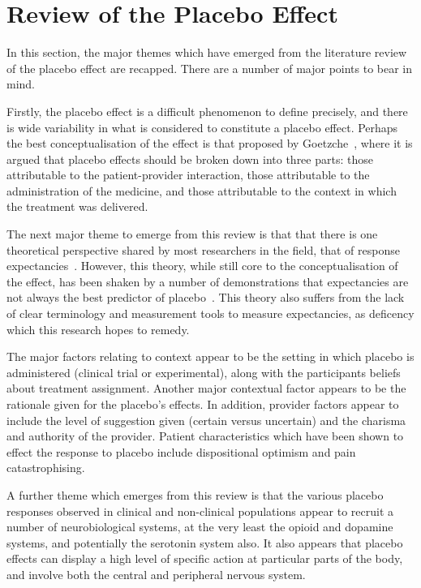 \section{Review of the Placebo Effect}
\label{sec:revi-plac-effect}

In this section, the major themes which have emerged from the literature review of the placebo effect are recapped. There are a number of major points to bear in mind. 

Firstly, the placebo effect is a difficult phenomenon to define precisely, and there is wide variability in what is considered to constitute a placebo effect. Perhaps the best conceptualisation of the effect is that proposed by Goetzche~\cite{Gotzsche1995}, where it is argued that placebo effects should be broken down into three parts: those attributable to the patient-provider interaction, those attributable to the administration of the medicine, and those attributable to the context in which the treatment was delivered. 

The next major theme to emerge from this review is that that there is one theoretical perspective shared by most researchers in the field, that of response expectancies~\cite{Kirsch1997,Kirsch1985}. However, this theory, while still core to the conceptualisation of the effect, has been shaken by a number of demonstrations that expectancies are not always the best predictor of placebo~\cite{Hyland2006,Geers2005a}. This theory also suffers from the lack of clear terminology and measurement tools to measure expectancies, as deficency which this research hopes to remedy. 

The major factors relating to context appear to be the setting in which placebo is administered (clinical trial or experimental), along with the participants beliefs about treatment assignment. Another major contextual factor appears to be the rationale given for the placebo's effects.  In addition, provider factors appear to include the level of suggestion given (certain versus uncertain) and the charisma and authority of the provider. Patient characteristics which have been shown to effect the response to placebo include dispositional optimism and pain catastrophising. 


A further theme which emerges from this review is that the various placebo responses observed in clinical and non-clinical populations appear to recruit a number of neurobiological systems, at the very least the opioid and dopamine systems, and potentially the serotonin system also. It also appears that placebo effects can display a high level of specific action at particular parts of the body, and involve both the central and peripheral nervous system. 

